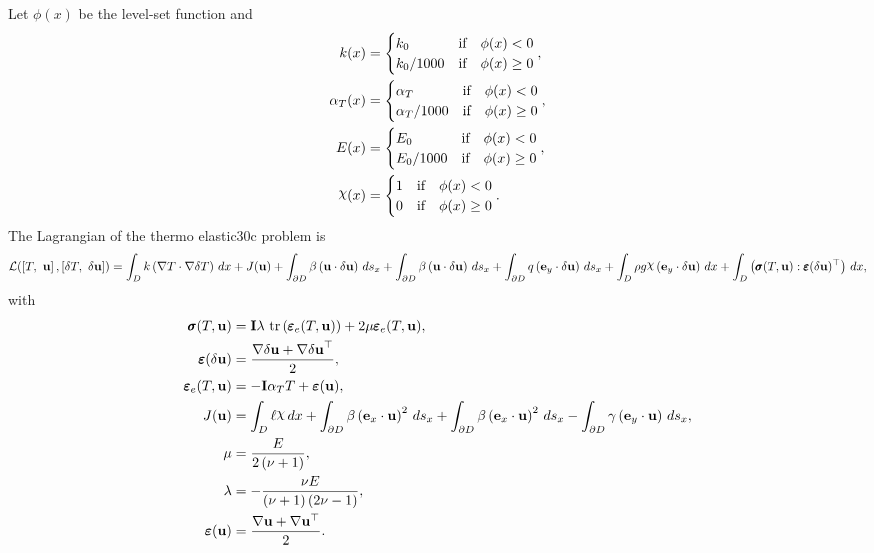 \documentclass[preview]{standalone}
\let\oldcdot\cdot
\let\cdot\oldcdot
\begin{document}
Let $\phi(x)$ be the level-set function and
 \begin{align*}k(x) &= \begin{cases} k_0 & \mbox{if}\quad \phi(x) < 0 \\ k_0/1000 & \mbox{if}\quad \phi(x)  \ge 0 \end{cases},\\
\alpha_{T}(x) &= \begin{cases} \alpha_T & \mbox{if}\quad \phi(x) < 0 \\ \alpha_T/1000 & \mbox{if}\quad \phi(x)  \ge 0 \end{cases},\\
E(x) &= \begin{cases} E_0 & \mbox{if}\quad \phi(x) < 0 \\ E_0/1000 & \mbox{if}\quad \phi(x)  \ge 0 \end{cases},\\
\raisebox{\depth}{$\chi$}(x) &= \begin{cases} 1 & \mbox{if}\quad \phi(x) < 0 \\ 0 & \mbox{if}\quad \phi(x)  \ge 0 \end{cases}.\end{align*}
The Lagrangian of the thermo elastic30c problem is
\begin{dmath*}
\mathcal L(\left[ T, \  {\mathbf{ u }}\right],\left[ \delta T, \  {\delta\mathbf{  u }}\right]) =  \int_{D} k \left(  \nabla T  \cdot  \nabla \delta T  \right) \,dx + J({\mathbf{ u }}) +  \int_{\partial D} \beta \left( {\mathbf{ u }} \cdot {\delta\mathbf{  u }} \right) \,ds_x +  \int_{\partial D} \beta \left( {\mathbf{ u }} \cdot {\delta\mathbf{  u }} \right) \,ds_x +  \int_{\partial D} q \left( \mathbf e_y \cdot {\delta\mathbf{  u }} \right) \,ds_x +  \int_{D} \rho g \raisebox{\depth}{$\chi$} \left( \mathbf e_y \cdot {\delta\mathbf{  u }} \right) \,dx +  \int_{D} \left( \pmb\sigma(T,{\mathbf{ u }}) \mathrel{:}  \pmb\varepsilon({\delta\mathbf{  u }})^\top  \right) \,dx , 
\end{dmath*}
with 
\begin{align*}
\pmb\sigma(T,{\mathbf{ u }}) &= \mathbf{I} \lambda  \,\operatorname{tr}\left(\pmb\varepsilon_{e}(T,{\mathbf{ u }})\right)  + 2 \mu \pmb\varepsilon_{e}(T,{\mathbf{ u }}),\\
\pmb\varepsilon({\delta\mathbf{  u }}) &= \frac{ \nabla {\delta\mathbf{  u }}  +   \nabla {\delta\mathbf{  u }} ^\top }{2},\\
\pmb\varepsilon_{e}(T,{\mathbf{ u }}) &= - \mathbf{I} \alpha_{T} T + \bm\varepsilon({\mathbf{ u }}),\\
J({\mathbf{ u }}) &=  \int_{D} \ell \raisebox{\depth}{$\chi$} \,dx +  \int_{\partial D} \beta \left( \mathbf e_x \cdot {\mathbf{ u }} \right)^{2} \,ds_x +  \int_{\partial D} \beta \left( \mathbf e_x \cdot {\mathbf{ u }} \right)^{2} \,ds_x -  \int_{\partial D} \gamma \left( \mathbf e_y \cdot {\mathbf{ u }} \right) \,ds_x,\\
\mu &= \frac{E}{2 \left(\nu + 1\right)},\\
\lambda &= - \frac{\nu E}{\left(\nu + 1\right) \left(2 \nu - 1\right)},\\
\bm\varepsilon({\mathbf{ u }}) &= \frac{ \nabla {\mathbf{ u }}  +   \nabla {\mathbf{ u }} ^\top }{2}.
 \end{align*}
\end{document}
